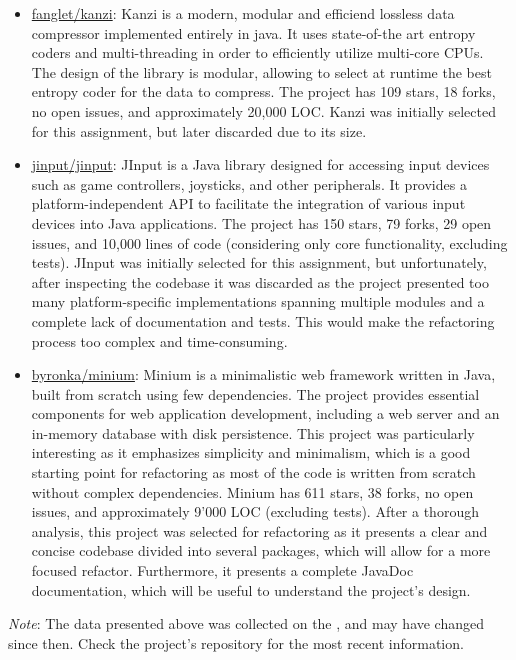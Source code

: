 \begin{itemize}
	\item \href{https://github.com/flanglet/kanzi}{fanglet/kanzi}: Kanzi is a modern, modular and efficiend lossless data compressor implemented entirely in java. It uses state-of-the art entropy coders and multi-threading in order to efficiently utilize multi-core CPUs. The design of the library is modular, allowing to select at runtime the best entropy coder for the data to compress. The project has 109 stars, 18 forks, no open issues, and approximately 20,000 LOC. Kanzi was initially selected for this assignment, but later discarded due to its size.
	\item \href{https://github.com/jinput/jinput}{jinput/jinput}: JInput is a Java library designed for accessing input devices such as game controllers, joysticks, and other peripherals. It provides a platform-independent API to facilitate the integration of various input devices into Java applications. The project has 150 stars, 79 forks, 29 open issues, and 10,000 lines of code (considering only core functionality, excluding tests). JInput was initially selected for this assignment, but unfortunately, after inspecting the codebase it was discarded as the project presented too many platform-specific implementations spanning multiple modules and a complete lack of documentation and tests. This would make the refactoring process too complex and time-consuming.
	\item \href{https://github.com/byronka/minum}{byronka/minium}: Minium is a minimalistic web framework written in Java, built from scratch using few dependencies. The project provides essential components for web application development, including a web server and an in-memory database with disk persistence. This project was particularly interesting as it emphasizes simplicity and minimalism, which is a good starting point for refactoring as most of the code is written from scratch without complex dependencies. Minium has 611 stars, 38 forks, no open issues, and approximately 9'000 LOC (excluding tests). After a thorough analysis, this project was selected for refactoring as it presents a clear and concise codebase divided into several packages, which will allow for a more focused refactor. Furthermore, it presents a complete JavaDoc documentation, which will be useful to understand the project's design.
\end{itemize}

\noindent \textit{Note}: The data presented above was collected on the , and may have changed since then. Check the project's repository for the most recent information.

